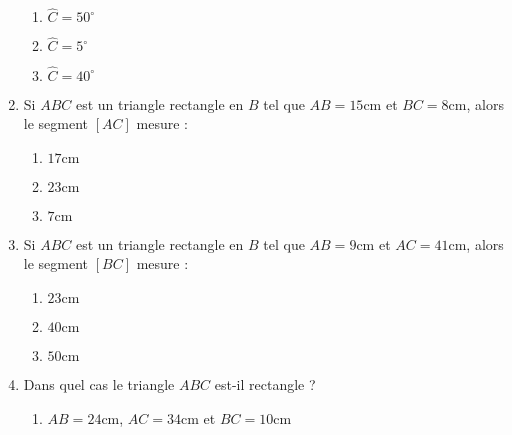 \documentclass[oneside,twoside]{book}
\begin{document}
\begin{enumerate}
\begin{enumerate}

\item\MauvaiseReponse $\widehat{C}=50^{\circ}$

\item\MauvaiseReponse $\widehat{C}=5^{\circ}$

\item\BonneReponse $\widehat{C}=40^{\circ}$

\end{enumerate}



\item Si $ABC$ est un triangle rectangle en $B$ tel que $AB=15\mathrm{cm}$ et $BC=8\mathrm{cm}$, alors le segment $\left[AC\right]$ mesure :

\begin{enumerate}

\item\BonneReponse $17\mathrm{cm}$

\item\MauvaiseReponse $23\mathrm{cm}$

\item\MauvaiseReponse $7\mathrm{cm}$

\end{enumerate}



\item Si $ABC$ est un triangle rectangle en $B$ tel que $AB=9\mathrm{cm}$ et $AC=41\mathrm{cm}$, alors le segment $\left[BC\right]$ mesure :

\begin{enumerate}


\item\MauvaiseReponse $23\mathrm{cm}$
\item\BonneReponse $40\mathrm{cm}$

\item\MauvaiseReponse $50\mathrm{cm}$

\end{enumerate}



\item Dans quel cas le triangle $ABC$ est-il rectangle ?

\begin{enumerate}


\item\MauvaiseReponse $AB=24\mathrm{cm}$, $AC=34\mathrm{cm}$ et $BC=10\mathrm{cm}$


\end{enumerate}
\end{enumerate}
\end{document}
